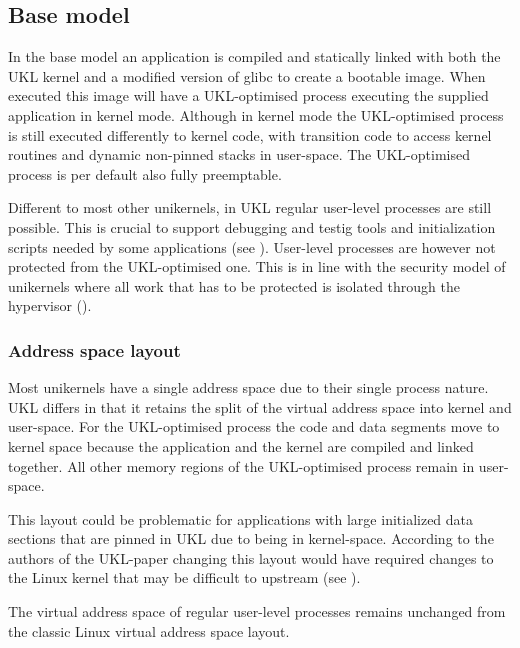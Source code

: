 \documentclass[10pt,twocolumn,a4paper]{article}
\begin{document}
  \subsection{Base model}\label{sec:base-model}
    In the base model an application is compiled and statically linked with both 
    the UKL kernel and a modified version of glibc to create a bootable image.
    When executed this image will have a UKL-optimised process executing the supplied 
    application in kernel mode.
    Although in kernel mode the UKL-optimised process is still executed differently to kernel code,
    with transition code to access kernel routines and dynamic non-pinned stacks in user-space.
    The UKL-optimised process is per default also fully preemptable.

    Different to most other unikernels, in UKL regular user-level processes are still possible.
    This is crucial to support debugging and testig tools and initialization scripts needed by
    some applications (see ).
    User-level processes are however not protected from the UKL-optimised one.
    This is in line with the security model of unikernels where all work that has to 
    be protected is isolated through the hypervisor ().

    \subsubsection{Address space layout}
      Most unikernels have a single address space due to their single process nature.
      UKL differs in that it retains the split of the virtual address space into kernel and user-space.
      For the UKL-optimised process the code and data segments move to kernel space because
      the application and the kernel are compiled and linked together.
      All other memory regions of the UKL-optimised process remain in user-space.

      This layout could be problematic for applications with large initialized data sections
      that are pinned in UKL due to being in kernel-space.
      According to the authors of the UKL-paper changing this layout would have required changes
      to the Linux kernel that may be difficult to upstream (see ).

      The virtual address space of regular user-level processes remains unchanged from
      the classic Linux virtual address space layout.
\end{document}
